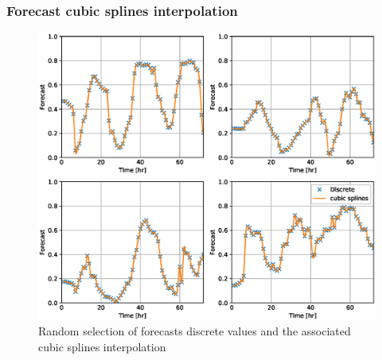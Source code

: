 \documentclass[aspectratio=169]{beamer}\usepackage[utf8]{inputenc}
\begin{document}
\begin{frame}\frametitle{ Forecast cubic splines interpolation }

\begin{figure}
    \includegraphics[scale=0.3]{Figures/forecast_splines.eps}
  \caption{  Random selection of forecasts discrete values and the associated cubic splines interpolation }
\end{figure}

\end{frame}

%
%
%
%
%
%
%
%
%
%
%


\end{document}
